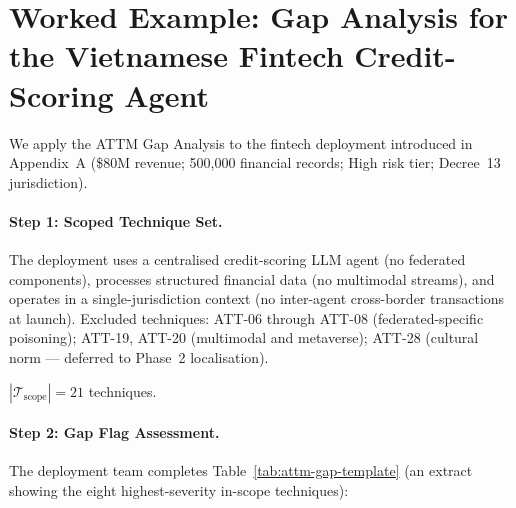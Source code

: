 \section{Worked Example: Gap Analysis for the Vietnamese Fintech
         Credit-Scoring Agent}
\label{sec:attm-worked-example}

We apply the ATTM Gap Analysis to the fintech deployment introduced
in Appendix~A (\$80M revenue; 500,000 financial records; High risk
tier; Decree~13 jurisdiction).

\paragraph{Step 1: Scoped Technique Set.}
The deployment uses a centralised credit-scoring LLM agent (no
federated components), processes structured financial data (no
multimodal streams), and operates in a single-jurisdiction context
(no inter-agent cross-border transactions at launch).  Excluded
techniques: ATT-06 through ATT-08 (federated-specific poisoning);
ATT-19, ATT-20 (multimodal and metaverse); ATT-28 (cultural norm ---
deferred to Phase~2 localisation).

$|\mathcal{T}_{\text{scope}}| = 21$ techniques.

\paragraph{Step 2: Gap Flag Assessment.}
The deployment team completes Table~\ref{tab:attm-gap-template}
(an extract showing the eight highest-severity in-scope techniques):

